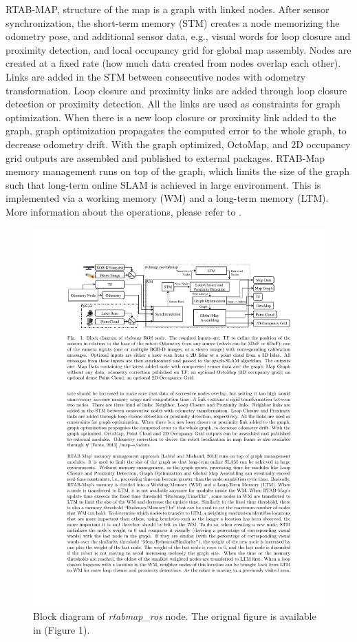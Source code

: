 \documentclass[10pt,journal,compsoc]{IEEEtran}
\begin{document}
RTAB-MAP, structure of the map is a graph with linked nodes. After sensor synchronization, the short-term memory (STM) creates a node memorizing the odometry pose, and additional sensor data, e.g., visual words for loop closure and proximity detection, and local occupancy grid for global map assembly. Nodes are created at a fixed rate (how much data created from nodes overlap each other). Links are added in the STM between consecutive nodes with odometry transformation. Loop closure and proximity links are added through loop closure detection or proximity detection. All the links are used as constraints for graph optimization. When there is a new loop closure or proximity link added to the graph, graph optimization propagates the computed error to the whole graph, to decrease odometry drift. With the graph optimized, OctoMap, and 2D occupancy grid outputs are assembled and published to external packages. RTAB-Map memory management runs on top of the graph, which limits the size of the graph such that long-term online SLAM is achieved in large environment. This is implemented via a working memory (WM) and a long-term memory (LTM). More information about the operations, please refer to \cite{labbertab}.

\begin{figure}[thpb]
      \centering
      \includegraphics[width=\linewidth]{rtabmap_ros}
      \caption{Block diagram of \textit{rtabmap\_ros}  node. The orignal figure is available in \cite{labbertab} (Figure 1).}
      \label{fig:rtabmap_ros}
\end{figure}
\end{document}
